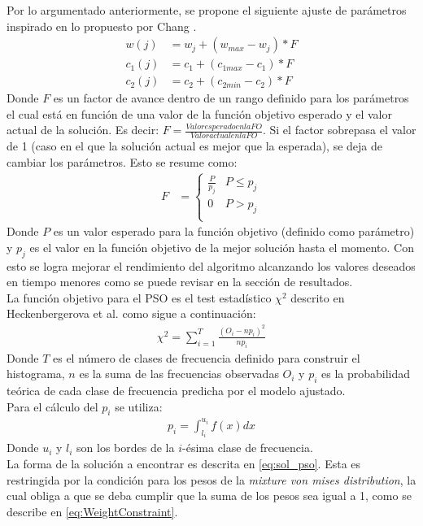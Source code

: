 Por lo argumentado anteriormente, se propone el siguiente ajuste de parámetros inspirado en lo propuesto por Chang \cite{Chang10_2}.\\  
\begin{align}\label{eq:VariationParameters_new}
    w(j) &= w_j + (w_{max} - w_j) * F \\
    c_{1}(j) &= c_1 + (c_{1max} - c_1) * F \\
    c_{2}(j) &= c_2 + (c_{2min} - c_2) * F
\end{align} 
Donde $F$ es un factor de avance dentro de un rango definido para los parámetros el cual está en función de una valor de la función objetivo esperado y el valor actual de la solución. Es decir: $F = \frac{Valor esperado en la FO}{Valor actual en la FO}$. Si el factor sobrepasa el valor de 1 (caso en el que la solución actual es mejor que la esperada), se deja de cambiar los parámetros. Esto se resume como:
\begin{align}\label{eq:restriction_var_par_new}
    F &= 
        \left\{
            \begin{array}{ll}
                \frac{P}{p_j}  & P \leq p_j\\
                0 & P > p_j\\
            \end{array}
        \right.
\end{align}
Donde $P$ es un valor esperado para la función objetivo (definido como parámetro) y $p_j$ es el valor en la función objetivo de la mejor solución hasta el momento.
 Con esto se logra mejorar el rendimiento del algoritmo alcanzando los valores deseados en tiempo menores como se puede revisar en la sección de resultados.\\
La función objetivo para el PSO es el test estadístico $\chi^2$ descrito en Heckenbergerova et al. \cite{Heckenbergerova15} como sigue a continuación:
\begin{align}\label{eq:FO_Direction}
    \chi^2 = \sum_{i=1}^{T}\frac{(O_i - np_{i})^2}{np_i}
\end{align}
Donde $T$ es el número de clases de frecuencia definido para construir el histograma, $n$ es la suma de las frecuencias observadas $O_i$ y $p_i$ es la probabilidad teórica de cada clase de frecuencia predicha por el modelo ajustado.\\
Para el cálculo del $p_i$ se utiliza:
\begin{align}
    p_i = \int_{l_i}^{u_i} f(x) dx
\end{align}
Donde $u_i$ y $l_i$ son los bordes de la $i$-ésima clase de frecuencia.\\
La forma de la solución a encontrar es descrita en \ref{eq:sol_pso}. Esta es restringida por la condición para los pesos de la \emph{mixture von mises distribution}, la cual obliga a que se deba cumplir que la suma de los pesos sea igual a 1, como se describe en \ref{eq:WeightConstraint}.

